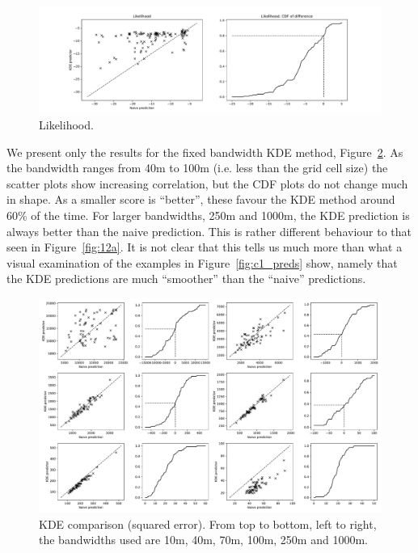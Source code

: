\documentclass[twoside,a4paper,twocolumn,10pt]{article}
\theoremstyle{plain}
\theoremstyle{definition}
\begin{document}
\begin{figure}
	\includegraphics[width=\textwidth]{../details/northside_likelihood.pdf}
  \caption{Likelihood.}
   \label{fig:c1_like}
\end{figure}

We present only the results for the fixed bandwidth KDE method, Figure~\ref{fig:c1_kde}.
As the bandwidth ranges from 40m to 100m (i.e. less than the grid cell size) the scatter
plots show increasing correlation, but the CDF plots do not change much in shape.  As a
smaller score is ``better'', these favour the KDE method around 60\% of the time.
For larger bandwidths, 250m and 1000m, the KDE prediction is always better than the naive
prediction.  This is rather different behaviour to that seen in Figure~\ref{fig:12a}.
It is not clear that this tells us
much more than what a visual examination of the examples in Figure~\ref{fig:c1_preds}
show, namely that the KDE predictions are much ``smoother'' than the ``naive''
predictions.

\begin{figure}
	\includegraphics[width=\textwidth]{../details/northside_kde.pdf}
  \caption{KDE comparison (squared error).  From top to bottom, left to right,
the bandwidths used are 10m, 40m, 70m, 100m, 250m and 1000m.}
   \label{fig:c1_kde}
\end{figure}
\end{document}
